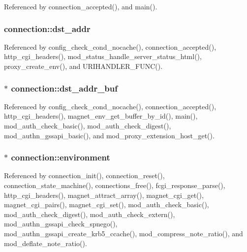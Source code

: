 Referenced by connection\-\_\-accepted(), and main().

\hypertarget{structconnection_a908b051bd40a4075c2502e75755aa62b}{
\subsubsection[{dst\-\_\-addr}]{ connection\-::dst\-\_\-addr}}\label{structconnection_a908b051bd40a4075c2502e75755aa62b}


Referenced by config\-\_\-check\-\_\-cond\-\_\-nocache(), connection\-\_\-accepted(), http\-\_\-cgi\-\_\-headers(), mod\-\_\-status\-\_\-handle\-\_\-server\-\_\-status\-\_\-html(), proxy\-\_\-create\-\_\-env(), and U\-R\-I\-H\-A\-N\-D\-L\-E\-R\-\_\-\-F\-U\-N\-C().

\hypertarget{structconnection_ab67760a30c3d3819b625beb7bdd1e635}{
\subsubsection[{dst\-\_\-addr\-\_\-buf}]{$\ast$ connection\-::dst\-\_\-addr\-\_\-buf}}\label{structconnection_ab67760a30c3d3819b625beb7bdd1e635}


Referenced by config\-\_\-check\-\_\-cond\-\_\-nocache(), connection\-\_\-accepted(), http\-\_\-cgi\-\_\-headers(), magnet\-\_\-env\-\_\-get\-\_\-buffer\-\_\-by\-\_\-id(), main(), mod\-\_\-auth\-\_\-check\-\_\-basic(), mod\-\_\-auth\-\_\-check\-\_\-digest(), mod\-\_\-authn\-\_\-gssapi\-\_\-basic(), and mod\-\_\-proxy\-\_\-extension\-\_\-host\-\_\-get().

\hypertarget{structconnection_accccbe3ddcf8b246d8d6ee93c84e6c9b}{
\subsubsection[{environment}]{$\ast$ connection\-::environment}}\label{structconnection_accccbe3ddcf8b246d8d6ee93c84e6c9b}


Referenced by connection\-\_\-init(), connection\-\_\-reset(), connection\-\_\-state\-\_\-machine(), connections\-\_\-free(), fcgi\-\_\-response\-\_\-parse(), http\-\_\-cgi\-\_\-headers(), magnet\-\_\-attract\-\_\-array(), magnet\-\_\-cgi\-\_\-get(), magnet\-\_\-cgi\-\_\-pairs(), magnet\-\_\-cgi\-\_\-set(), mod\-\_\-auth\-\_\-check\-\_\-basic(), mod\-\_\-auth\-\_\-check\-\_\-digest(), mod\-\_\-auth\-\_\-check\-\_\-extern(), mod\-\_\-authn\-\_\-gssapi\-\_\-check\-\_\-spnego(), mod\-\_\-authn\-\_\-gssapi\-\_\-create\-\_\-krb5\-\_\-ccache(), mod\-\_\-compress\-\_\-note\-\_\-ratio(), and mod\-\_\-deflate\-\_\-note\-\_\-ratio().

